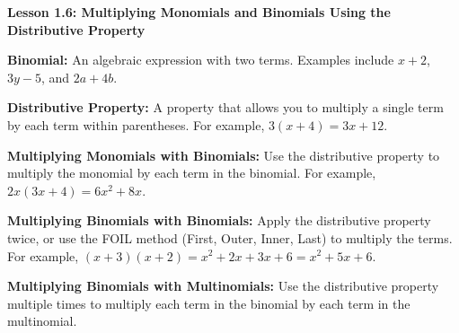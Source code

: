 \begin{center}
\textbf{Lesson 1.6: Multiplying Monomials and Binomials Using the Distributive Property}
\end{center}


    \textbf{Binomial:} An algebraic expression with two terms. Examples include \( x + 2 \), \( 3y - 5 \), and \( 2a + 4b \).

    \textbf{Distributive Property:} A property that allows you to multiply a single term by each term within parentheses. For example, \( 3(x + 4) = 3x + 12 \).

\textbf{Multiplying Monomials with Binomials:} Use the distributive property to multiply the monomial by each term in the binomial. For example, \( 2x(3x + 4) = 6x^2 + 8x \).

\textbf{Multiplying Binomials with Binomials:} Apply the distributive property twice, or use the FOIL method (First, Outer, Inner, Last) to multiply the terms. For example, \( (x + 3)(x + 2) = x^2 + 2x + 3x + 6 = x^2 + 5x + 6 \).

\textbf{Multiplying Binomials with Multinomials:} Use the distributive property multiple times to multiply each term in the binomial by each term in the multinomial.

 

 

